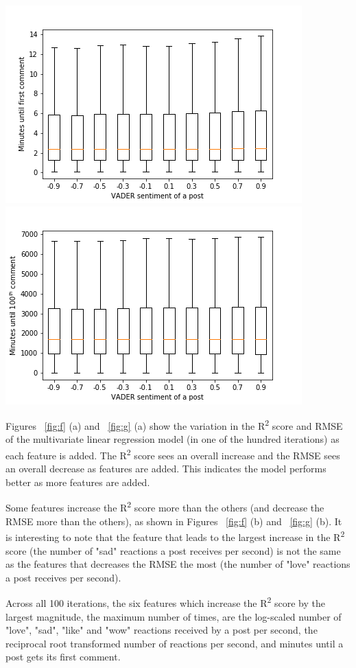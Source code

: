 \documentclass[twoside]{article}
\begin{document}
\label{fig:d}
\endgroup
\begingroup
\centering
\includegraphics[scale=0.6]{images/sentiment_first_comment_box}
\includegraphics[scale=0.6]{sentiment_100_comment_box}
\label{fig:e}
\endgroup
\begin{multicols}{2}
Figures ~\ref{fig:f} (a) and ~\ref{fig:g} (a) show the variation in the R\textsuperscript{2} score and RMSE of the multivariate linear regression model (in one of the hundred iterations) as each feature is added. The R\textsuperscript{2} score sees an overall increase and the RMSE sees an overall decrease as features are added. This indicates the model performs better as more features are added. 

Some features increase the R\textsuperscript{2} score more than the others (and decrease the RMSE more than the others), as shown in Figures ~\ref{fig:f} (b) and ~\ref{fig:g} (b). It is interesting to note that the feature that leads to the largest increase in the R\textsuperscript{2} score (the number of "sad" reactions a post receives per second) is not the same as the features that decreases the RMSE the most (the number of "love" reactions a post receives per second). 

Across all 100 iterations, the six features which increase the R\textsuperscript{2} score by the largest magnitude, the maximum number of times, are the log-scaled number of "love", "sad", "like" and "wow" reactions received by a post per second, the reciprocal root transformed number of reactions per second, and minutes until a post gets its first comment.
\end{multicols}
\end{document}
